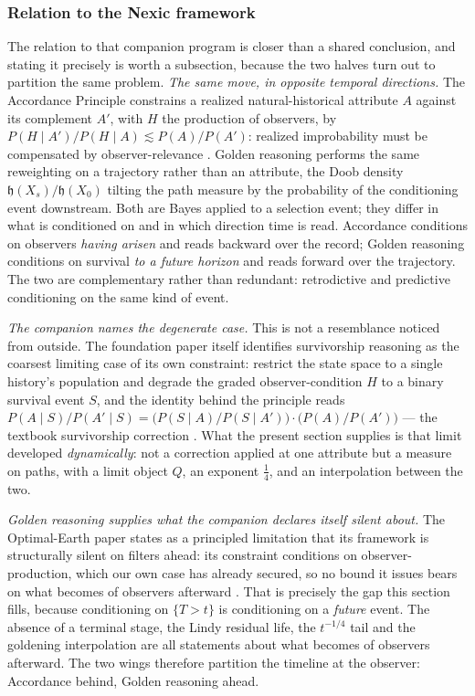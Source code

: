 \documentclass[11pt]{article}
\numberwithin{equation}{section}
\theoremstyle{plain}
\theoremstyle{definition}
\theoremstyle{remark}
\newcommand{\hm}{\mathfrak{h}}
\begin{document}
\subsubsection{Relation to the Nexic framework}
\label{gr:subsub:nexic}

The relation to that companion program is closer than a shared
conclusion, and stating it precisely is worth a subsection, because the
two halves turn out to partition the same problem. \emph{The same move, in opposite temporal directions.} The Accordance
Principle constrains a realized natural-historical attribute $A$ against
its complement $A'$, with $H$ the production of observers, by
$P(H\mid A')/P(H\mid A)\lesssim P(A)/P(A')$: realized improbability must
be compensated by observer-relevance \cite{Ben26Found}. Golden reasoning
performs the same reweighting on a trajectory rather than an attribute,
the Doob density $\hm(X_s)/\hm(X_0)$ tilting the path measure by the
probability of the conditioning event downstream. Both are Bayes applied
to a selection event; they differ in what is conditioned on and in which
direction time is read. Accordance conditions on observers \emph{having
arisen} and reads backward over the record; Golden reasoning conditions
on survival \emph{to a future horizon} and reads forward over the
trajectory. The two are complementary rather than redundant:
retrodictive and predictive conditioning on the same kind of event.

\emph{The companion names the degenerate case.} This is not a
resemblance noticed from outside. The foundation paper itself identifies
survivorship reasoning as the coarsest limiting case of its own
constraint: restrict the state space to a single history's population
and degrade the graded observer-condition $H$ to a binary survival event
$S$, and the identity behind the principle reads
$P(A\mid S)/P(A'\mid S) = \bigl(P(S\mid A)/P(S\mid A')\bigr)\cdot
\bigl(P(A)/P(A')\bigr)$ --- the textbook survivorship correction
\cite{Ben26Found}. What the present section supplies is that limit
developed \emph{dynamically}: not a correction applied at one attribute
but a measure on paths, with a limit object $Q$, an exponent
$\tfrac14$, and an interpolation between the two.

\emph{Golden reasoning supplies what the companion declares itself
silent about.} The Optimal-Earth paper states as a principled limitation
that its framework is structurally silent on filters ahead: its
constraint conditions on observer-production, which our own case has
already secured, so no bound it issues bears on what becomes of
observers afterward \cite{Ben26Optimal}. That is precisely the gap this
section fills, because conditioning on $\{T>t\}$ is conditioning on a
\emph{future} event. The absence of a terminal stage, the Lindy residual
life, the $t^{-1/4}$ tail and the goldening interpolation are all
statements about what becomes of observers afterward. The two wings
therefore partition the timeline at the observer: Accordance behind,
Golden reasoning ahead.
\end{document}
